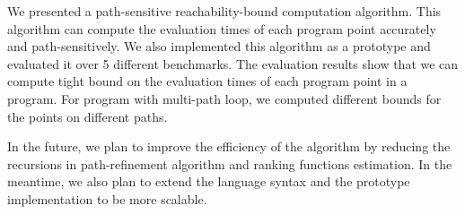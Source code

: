We presented a path-sensitive reachability-bound computation algorithm.
This algorithm can compute the evaluation times of each program point accurately and path-sensitively.
We also implemented this algorithm as a prototype and evaluated it over 5 different benchmarks.
The evaluation results show that we can compute tight bound on the evaluation times of each program point in a program. For program with multi-path loop, we computed different bounds for the points on different paths.

In the future, we plan to improve the efficiency of the algorithm by reducing the recursions in path-refinement algorithm and ranking functions estimation.
In the meantime, we also plan to extend the language syntax and the prototype implementation to be more scalable.

